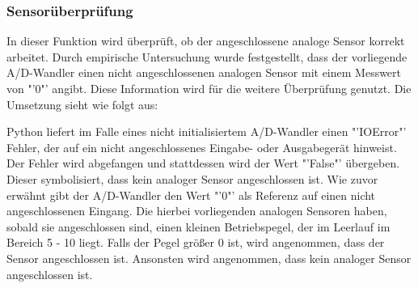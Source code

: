\subsubsection*{Sensorüberprüfung} \label{Sensorueberpruefung}
	In dieser Funktion wird überprüft, ob der angeschlossene analoge Sensor korrekt arbeitet. Durch empirische Untersuchung wurde festgestellt, dass der vorliegende \ac{A/D-Wandler} einen nicht angeschlossenen analogen Sensor mit einem Messwert von "'0"' angibt. Diese Information wird für die weitere Überprüfung genutzt. Die Umsetzung sieht wie folgt aus:
	
	Python liefert im Falle eines nicht initialisiertem \ac{A/D-Wandler} einen "'IOError"' Fehler, der auf ein nicht angeschlossenes Eingabe- oder Ausgabegerät hinweist. Der Fehler wird abgefangen und stattdessen wird der Wert "'False"' übergeben. Dieser symbolisiert, dass kein analoger Sensor angeschlossen ist. Wie zuvor erwähnt gibt der \ac{A/D-Wandler} den Wert "'0"' als Referenz auf einen nicht angeschlossenen Eingang. Die hierbei vorliegenden analogen Sensoren haben, sobald sie angeschlossen sind, einen kleinen Betriebspegel, der im Leerlauf im Bereich 5 - 10 liegt. Falls der Pegel größer 0 ist, wird angenommen, dass der Sensor angeschlossen ist. Ansonsten wird angenommen, dass kein analoger Sensor angeschlossen ist.
